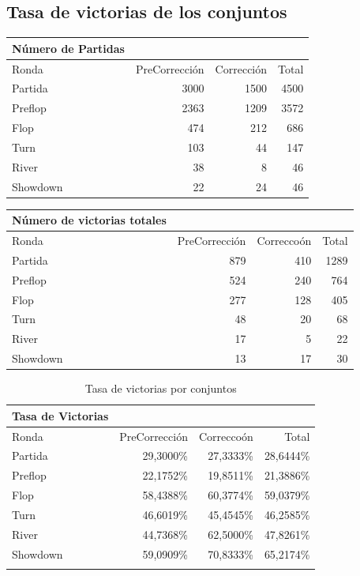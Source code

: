 \subsection{Tasa de victorias de los conjuntos}

\begin{longtable}[c]{lrrr}
\hline
Número de Partidas &  &  &  \\ \hline
Ronda & PreCorrección & Corrección & Total \\ \hline
Partida & 3000 & 1500 & 4500 \\ 
Preflop & 2363 & 1209 & 3572 \\ 
Flop & 474 & 212 & 686 \\ 
Turn & 103 & 44 & 147 \\ 
River & 38 & 8 & 46 \\ 
Showdown & 22 & 24 & 46 \\ \hline
\end{longtable}

\begin{longtable}[c]{lrrr}
\hline
Número de victorias totales &  &  &  \\ \hline
Ronda & PreCorrección & Correccoón & Total \\ \hline
Partida & 879 & 410 & 1289 \\ 
Preflop & 524 & 240 & 764 \\ 
Flop & 277 & 128 & 405 \\ 
Turn & 48 & 20 & 68 \\ 
River & 17 & 5 & 22 \\ 
Showdown & 13 & 17 & 30 \\ \hline
\end{longtable}

\begin{longtable}[c]{lrrr}
\hline
Tasa de Victorias &  &  &  \\ \hline
Ronda & PreCorrección & Correccoón & Total \\ \hline
Partida & 29,3000\% & 27,3333\% & 28,6444\% \\ 
Preflop & 22,1752\% & 19,8511\% & 21,3886\% \\ 
Flop & 58,4388\% & 60,3774\% & 59,0379\% \\ 
Turn & 46,6019\% & 45,4545\% & 46,2585\% \\ 
River & 44,7368\% & 62,5000\% & 47,8261\% \\ 
Showdown & 59,0909\% & 70,8333\% & 65,2174\% \\ \hline
\caption{Tasa de victorias por conjuntos}
\label{tab:winrateT}
\end{longtable}

